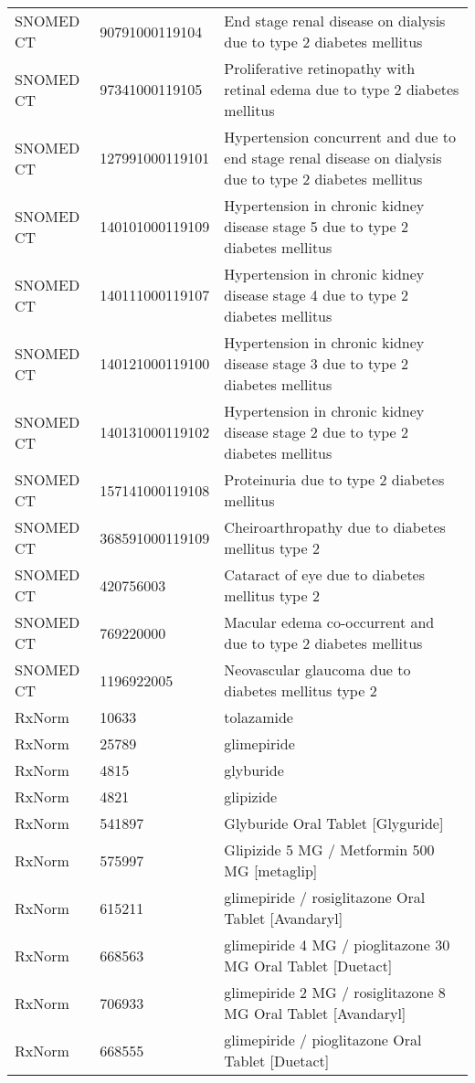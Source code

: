 \begin{longtable}{p{}p{}p{}}
  SNOMED CT & 90791000119104 & End stage renal disease on dialysis due to type 2 diabetes mellitus \\ 
  SNOMED CT & 97341000119105 & Proliferative retinopathy with retinal edema due to type 2 diabetes mellitus \\ 
  SNOMED CT & 127991000119101 & Hypertension concurrent and due to end stage renal disease on dialysis due to type 2 diabetes mellitus \\ 
  SNOMED CT & 140101000119109 & Hypertension in chronic kidney disease stage 5 due to type 2 diabetes mellitus \\ 
  SNOMED CT & 140111000119107 & Hypertension in chronic kidney disease stage 4 due to type 2 diabetes mellitus \\ 
  SNOMED CT & 140121000119100 & Hypertension in chronic kidney disease stage 3 due to type 2 diabetes mellitus \\ 
  SNOMED CT & 140131000119102 & Hypertension in chronic kidney disease stage 2 due to type 2 diabetes mellitus \\ 
  SNOMED CT & 157141000119108 & Proteinuria due to type 2 diabetes mellitus \\ 
  SNOMED CT & 368591000119109 & Cheiroarthropathy due to diabetes mellitus type 2 \\ 
  SNOMED CT & 420756003 & Cataract of eye due to diabetes mellitus type 2 \\ 
  SNOMED CT & 769220000 & Macular edema co-occurrent and due to type 2 diabetes mellitus \\ 
  SNOMED CT & 1196922005 & Neovascular glaucoma due to diabetes mellitus type 2 \\ 
  RxNorm & 10633 & tolazamide \\ 
  RxNorm & 25789 & glimepiride \\ 
  RxNorm & 4815 & glyburide \\ 
  RxNorm & 4821 & glipizide \\ 
  RxNorm & 541897 & Glyburide Oral Tablet [Glyguride] \\ 
  RxNorm & 575997 & Glipizide 5 MG / Metformin 500 MG [metaglip] \\ 
  RxNorm & 615211 & glimepiride / rosiglitazone Oral Tablet [Avandaryl] \\ 
  RxNorm & 668563 & glimepiride 4 MG / pioglitazone 30 MG Oral Tablet [Duetact] \\ 
  RxNorm & 706933 & glimepiride 2 MG / rosiglitazone 8 MG Oral Tablet [Avandaryl] \\ 
  RxNorm & 668555 & glimepiride / pioglitazone Oral Tablet [Duetact] \\ 

\end{longtable}
